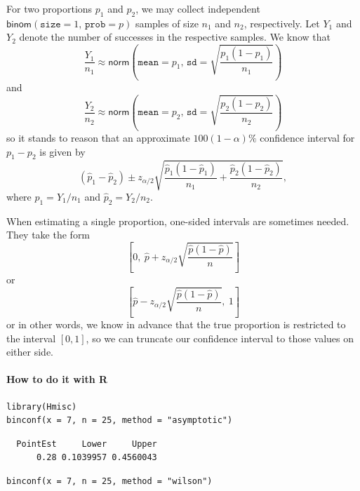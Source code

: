 \documentclass[captions=tableheading]{scrbook}
\begin{document}
For two proportions \(p_{1}\) and \(p_{2}\), we may collect independent \(\mathsf{binom}(\mathtt{size}=1,\,\mathtt{prob}=p)\) samples of size \(n_{1}\) and \(n_{2}\), respectively. Let \(Y_{1}\) and \(Y_{2}\) denote the number of successes in the respective samples. 
We know that
\[
\frac{Y_{1}}{n_{1}}\approx\mathsf{norm}\left(\mathtt{mean}=p_{1},\,\mathtt{sd}=\sqrt{\frac{p_{1}(1-p_{1})}{n_{1}}}\right)
\]
and
\[
\frac{Y_{2}}{n_{2}}\approx\mathsf{norm}\left(\mathtt{mean}=p_{2},\,\mathtt{sd}=\sqrt{\frac{p_{2}(1-p_{2})}{n_{2}}}\right)
\]
so it stands to reason that an approximate \(100(1-\alpha)\%\) confidence interval for \(p_{1}-p_{2}\) is given by
\begin{equation}
\left(\hat{p}_{1}-\hat{p}_{2}\right)\pm z_{\alpha/2}\sqrt{\frac{\hat{p}_{1}(1-\hat{p}_{1})}{n_{1}}+\frac{\hat{p}_{2}(1-\hat{p}_{2})}{n_{2}}},
\end{equation}
where \(\hat{p}_{1}=Y_{1}/n_{1}\) and \(\hat{p}_{2}=Y_{2}/n_{2}\).

\begin{rem}
When estimating a single proportion, one-sided intervals are sometimes needed. They take the form
\begin{equation}
\left[0,\ \hat{p}+z_{\alpha/2}\sqrt{\frac{\hat{p}(1-\hat{p})}{n}}\right]
\end{equation}
or
\begin{equation}
\left[\hat{p}-z_{\alpha/2}\sqrt{\frac{\hat{p}(1-\hat{p})}{n}},\ 1\right]
\end{equation}
or in other words, we know in advance that the true proportion is restricted to the interval \([0,1]\), so we can truncate our confidence interval to those values on either side.
\end{rem}


\paragraph*{How to do it with \textsf{R}}


\begin{verbatim}
library(Hmisc)
binconf(x = 7, n = 25, method = "asymptotic")
\end{verbatim}

\begin{verbatim}
  PointEst     Lower     Upper
      0.28 0.1039957 0.4560043
\end{verbatim}


\begin{verbatim}
binconf(x = 7, n = 25, method = "wilson")
\end{verbatim}
\end{document}
